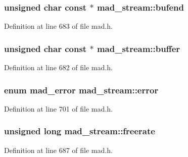 \subsubsection[{\texorpdfstring{bufend}{bufend}}]{\setlength{\rightskip}{0pt plus 5cm}unsigned char {\bf const} $\ast$ mad\+\_\+stream\+::bufend}\hypertarget{structmad__stream_ade2600fa5c62b5ea540c592ed5b4823c}{}\label{structmad__stream_ade2600fa5c62b5ea540c592ed5b4823c}


Definition at line 683 of file mad.\+h.

\subsubsection[{\texorpdfstring{buffer}{buffer}}]{\setlength{\rightskip}{0pt plus 5cm}unsigned char {\bf const} $\ast$ mad\+\_\+stream\+::buffer}\hypertarget{structmad__stream_aa66077a746888bc7ebfa9e357c464fed}{}\label{structmad__stream_aa66077a746888bc7ebfa9e357c464fed}


Definition at line 682 of file mad.\+h.

\subsubsection[{\texorpdfstring{error}{error}}]{\setlength{\rightskip}{0pt plus 5cm}enum {\bf mad\+\_\+error} mad\+\_\+stream\+::error}\hypertarget{structmad__stream_ac9a8e6b43a422325e581d73d28bb538a}{}\label{structmad__stream_ac9a8e6b43a422325e581d73d28bb538a}


Definition at line 701 of file mad.\+h.

\subsubsection[{\texorpdfstring{freerate}{freerate}}]{\setlength{\rightskip}{0pt plus 5cm}unsigned long mad\+\_\+stream\+::freerate}\hypertarget{structmad__stream_a28a048e98187e7ba0225f76136a1d295}{}\label{structmad__stream_a28a048e98187e7ba0225f76136a1d295}


Definition at line 687 of file mad.\+h.

